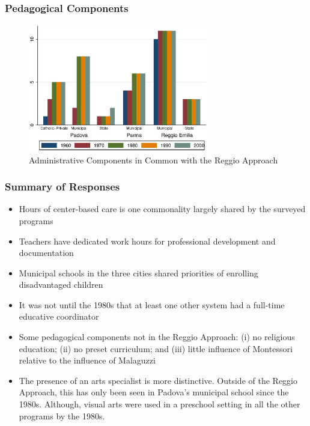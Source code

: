 \documentclass[static]{JJH-Beamer_PAGENOS}
\begin{document}

\begin{frame}
\frametitle{Pedagogical Components}
\centering
\begin{figure}[H]
\caption{Administrative Components in Common with the Reggio Approach}
\includegraphics[width=0.7\textwidth]{../../output/aggregatePedagogical.eps}
\end{figure}
\end{frame}


\begin{frame}
\frametitle{Summary of Responses}
\footnotesize
\begin{itemize}
	\item Hours of center-based care is one commonality largely shared by the surveyed programs
	\item Teachers have dedicated work hours for professional development and documentation
	\item Municipal schools in the three cities shared priorities of enrolling disadvantaged children
	\item It was not until the 1980s that at least one other system had a full-time educative coordinator
	\item Some pedagogical components not in the Reggio Approach: (i) no religious education; (ii) no preset curriculum; and (iii) little influence of Montessori relative to the influence of Malaguzzi
	\item The presence of an arts specialist is more distinctive. Outside of the Reggio Approach, this has only been seen in Padova's municipal school since the 1980s. Although, visual arts were used in a preschool setting in all the other programs by the 1980s.  
\end{itemize}
\end{frame}
\end{document}
